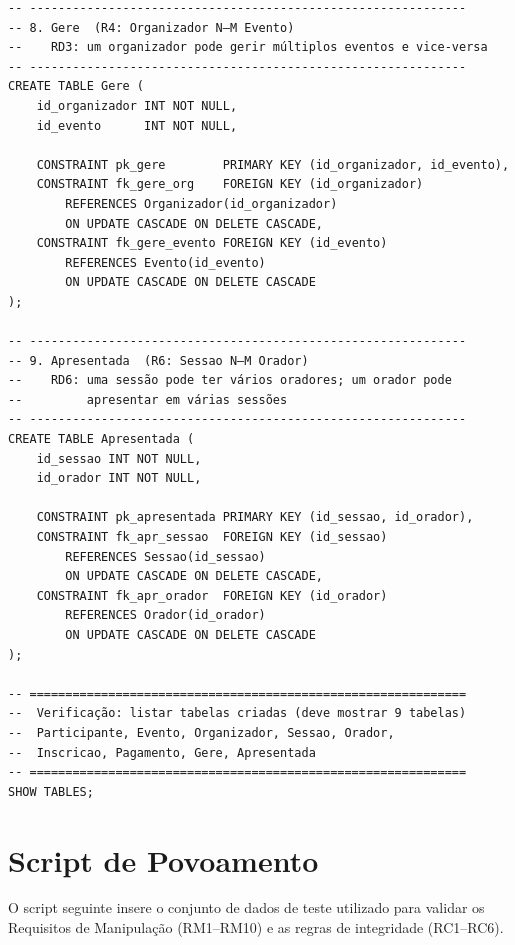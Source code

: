\documentclass[runningheads]{llncs}
\begin{document}
\begin{small}
\begin{verbatim}
-- -------------------------------------------------------------
-- 8. Gere  (R4: Organizador N—M Evento)
--    RD3: um organizador pode gerir múltiplos eventos e vice-versa
-- -------------------------------------------------------------
CREATE TABLE Gere (
    id_organizador INT NOT NULL,
    id_evento      INT NOT NULL,

    CONSTRAINT pk_gere        PRIMARY KEY (id_organizador, id_evento),
    CONSTRAINT fk_gere_org    FOREIGN KEY (id_organizador)
        REFERENCES Organizador(id_organizador)
        ON UPDATE CASCADE ON DELETE CASCADE,
    CONSTRAINT fk_gere_evento FOREIGN KEY (id_evento)
        REFERENCES Evento(id_evento)
        ON UPDATE CASCADE ON DELETE CASCADE
);

-- -------------------------------------------------------------
-- 9. Apresentada  (R6: Sessao N—M Orador)
--    RD6: uma sessão pode ter vários oradores; um orador pode
--         apresentar em várias sessões
-- -------------------------------------------------------------
CREATE TABLE Apresentada (
    id_sessao INT NOT NULL,
    id_orador INT NOT NULL,

    CONSTRAINT pk_apresentada PRIMARY KEY (id_sessao, id_orador),
    CONSTRAINT fk_apr_sessao  FOREIGN KEY (id_sessao)
        REFERENCES Sessao(id_sessao)
        ON UPDATE CASCADE ON DELETE CASCADE,
    CONSTRAINT fk_apr_orador  FOREIGN KEY (id_orador)
        REFERENCES Orador(id_orador)
        ON UPDATE CASCADE ON DELETE CASCADE
);

-- =============================================================
--  Verificação: listar tabelas criadas (deve mostrar 9 tabelas)
--  Participante, Evento, Organizador, Sessao, Orador,
--  Inscricao, Pagamento, Gere, Apresentada
-- =============================================================
SHOW TABLES;
\end{verbatim}
\end{small}

\newpage
\section{Script de Povoamento}
\label{apx:populacao}

O script seguinte insere o conjunto de dados de teste utilizado para validar
os Requisitos de Manipulação (RM1--RM10) e as regras de integridade
(RC1--RC6).
\end{document}
